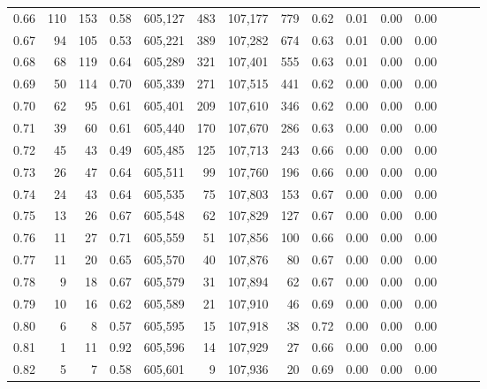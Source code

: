 \begin{tabular}{rrrrrrrrrrrrrrr}
0.66 &     110 &    153 &  0.58 &  605,127 &      483 &  107,177 &      779 &  0.62 &  0.01 &  0.00 &      0.00 \\
0.67 &      94 &    105 &  0.53 &  605,221 &      389 &  107,282 &      674 &  0.63 &  0.01 &  0.00 &      0.00 \\
0.68 &      68 &    119 &  0.64 &  605,289 &      321 &  107,401 &      555 &  0.63 &  0.01 &  0.00 &      0.00 \\
0.69 &      50 &    114 &  0.70 &  605,339 &      271 &  107,515 &      441 &  0.62 &  0.00 &  0.00 &      0.00 \\
0.70 &      62 &     95 &  0.61 &  605,401 &      209 &  107,610 &      346 &  0.62 &  0.00 &  0.00 &      0.00 \\
0.71 &      39 &     60 &  0.61 &  605,440 &      170 &  107,670 &      286 &  0.63 &  0.00 &  0.00 &      0.00 \\
0.72 &      45 &     43 &  0.49 &  605,485 &      125 &  107,713 &      243 &  0.66 &  0.00 &  0.00 &      0.00 \\
0.73 &      26 &     47 &  0.64 &  605,511 &       99 &  107,760 &      196 &  0.66 &  0.00 &  0.00 &      0.00 \\
0.74 &      24 &     43 &  0.64 &  605,535 &       75 &  107,803 &      153 &  0.67 &  0.00 &  0.00 &      0.00 \\
0.75 &      13 &     26 &  0.67 &  605,548 &       62 &  107,829 &      127 &  0.67 &  0.00 &  0.00 &      0.00 \\
0.76 &      11 &     27 &  0.71 &  605,559 &       51 &  107,856 &      100 &  0.66 &  0.00 &  0.00 &      0.00 \\
0.77 &      11 &     20 &  0.65 &  605,570 &       40 &  107,876 &       80 &  0.67 &  0.00 &  0.00 &      0.00 \\
0.78 &       9 &     18 &  0.67 &  605,579 &       31 &  107,894 &       62 &  0.67 &  0.00 &  0.00 &      0.00 \\
0.79 &      10 &     16 &  0.62 &  605,589 &       21 &  107,910 &       46 &  0.69 &  0.00 &  0.00 &      0.00 \\
0.80 &       6 &      8 &  0.57 &  605,595 &       15 &  107,918 &       38 &  0.72 &  0.00 &  0.00 &      0.00 \\
0.81 &       1 &     11 &  0.92 &  605,596 &       14 &  107,929 &       27 &  0.66 &  0.00 &  0.00 &      0.00 \\
0.82 &       5 &      7 &  0.58 &  605,601 &        9 &  107,936 &       20 &  0.69 &  0.00 &  0.00 &      0.00 \\

\end{tabular}
